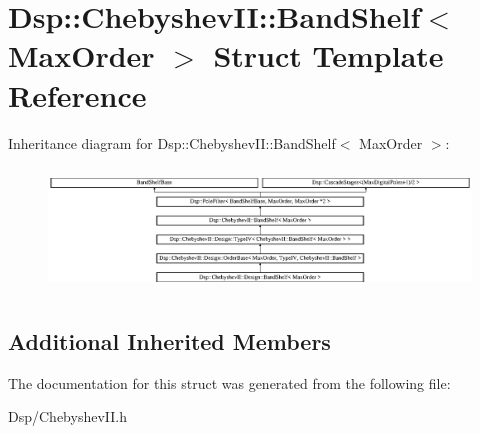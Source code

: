 \hypertarget{structDsp_1_1ChebyshevII_1_1BandShelf}{\section{Dsp\-:\-:Chebyshev\-I\-I\-:\-:Band\-Shelf$<$ Max\-Order $>$ Struct Template Reference}
\label{structDsp_1_1ChebyshevII_1_1BandShelf}
}
Inheritance diagram for Dsp\-:\-:Chebyshev\-I\-I\-:\-:Band\-Shelf$<$ Max\-Order $>$\-:\begin{figure}[H]
\begin{center}
\leavevmode
\includegraphics[height=3.326733cm]{structDsp_1_1ChebyshevII_1_1BandShelf}
\end{center}
\end{figure}
\subsection*{Additional Inherited Members}


The documentation for this struct was generated from the following file\-:\begin{DoxyCompactItemize}
\item 
Dsp/Chebyshev\-I\-I.\-h\end{DoxyCompactItemize}
